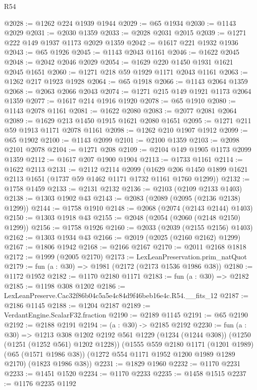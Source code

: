 \begin{lexlean}{R54}
\begin{coremodule}
@2028 := @1262 @224 @1939 @1944
@2029 := @65 @1934
@2030 := @1143 @2029
@2031 := @2030 @1359
@2033 := @2028 @2031 @2015
@2039 := @1271 @222 @149 @1937 @1173 @2029 @1359
@2042 := @1617 @221 @1932 @1936
@2043 := @65 @1926
@2045 := @1143 @2043 @1161
@2046 := @1622 @2045
@2048 := @2042 @2046 @2029
@2054 := @1629 @220 @1450 @1931 @1621 @2045 @1651
@2060 := @1271 @218 @59 @1929 @1171 @2043 @1161
@2063 := @1262 @217 @1923 @1928
@2064 := @65 @1918
@2066 := @1143 @2064 @1359
@2068 := @2063 @2066 @2043
@2074 := @1271 @215 @149 @1921 @1173 @2064 @1359
@2077 := @1617 @214 @1916 @1920
@2078 := @65 @1910
@2080 := @1143 @2078 @1161
@2081 := @1622 @2080
@2083 := @2077 @2081 @2064
@2089 := @1629 @213 @1450 @1915 @1621 @2080 @1651
@2095 := @1271 @211 @59 @1913 @1171 @2078 @1161
@2098 := @1262 @210 @1907 @1912
@2099 := @65 @1902
@2100 := @1143 @2099
@2101 := @2100 @1359
@2103 := @2098 @2101 @2078
@2104 := @1271 @208
@2109 := @2104 @149 @1905 @1173 @2099 @1359
@2112 := @1617 @207 @1900 @1904
@2113 := @1733 @1161
@2114 := @1622 @2113
@2131 := @2112
    @2114
    @2099
    (@1629 @206 @1450 @1899 @1621 @2113 @1651 (@1737 @59 @1462 @1171 @1732 @1161 @1760 @1299))
@2132 := @1758 @1459
@2133 := @2131 @2132
@2136 := @2103 (@2109 @2133 @1403)
@2138 := @1303 @1902 @43
@2143 := @2083 (@2089 (@2095 (@2136 @2138) @1299))
@2144 := @1758 @1910
@2148 := @2068 (@2074 (@2143 @2144) @1403)
@2150 := @1303 @1918 @43
@2155 := @2048 (@2054 (@2060 (@2148 @2150) @1299))
@2156 := @1758 @1926
@2160 := @2033 (@2039 (@2155 @2156) @1403)
@2162 := @1303 @1934 @43
@2166 := @2019 (@2025 (@2160 @2162) @1299)
@2167 := @1806 @1942
@2168 := @2166 @2167
@2170 := @2011 @2168 @1818
@2172 := @1999 (@2005 @2170)
@2173 := LexLeanPreservation.prim_natQuot
@2179 := fun (a : @30) => @1981 (@2172 (@2173 @1536 @1986 @38))
@2180 := @1172 @1952
@2182 := @1170 @2180 @1171
@2183 := fun (a : @30) => @2182
@2185 := @1198 @308 @1202
@2186 := LexLeanPreserve.Cac32f86b04c5a5e4c84d9f46beb16e4c.R54.__fits_12
@2187 := @2186 @1145
@2188 := @1204 @2187
@2189 := VerdantEngine.ScalarF32.fraction
@2190 := @2189 @1145
@2191 := @65 @2190
@2192 := @2188 @2191
@2194 := (a : @30) -> @2185 @2192
@2230 := fun (a : @30) =>
  @1213
    @308
    @1202
    @2192
    @561
    @1229
    (@1234 (@1244 @308))
    (@1250 (@1251 (@1252 @561) @1202 @1228))
    (@1555
      @559
      @2180
      @1171
      (@1201 @1989)
      (@65 (@1571 @1986 @38))
      (@1272 @554 @1171 @1952 @1200 @1989 @1289 @2170)
      (@1823 @1986 @38))
@2231 := @1829 @1960
@2232 := @1170 @2231
@2233 := @1451 @1520
@2234 := @1170 @2233
@2235 := @1458 @1515
@2237 := @1176 @2235 @1192

\end{coremodule}
\end{lexlean}
